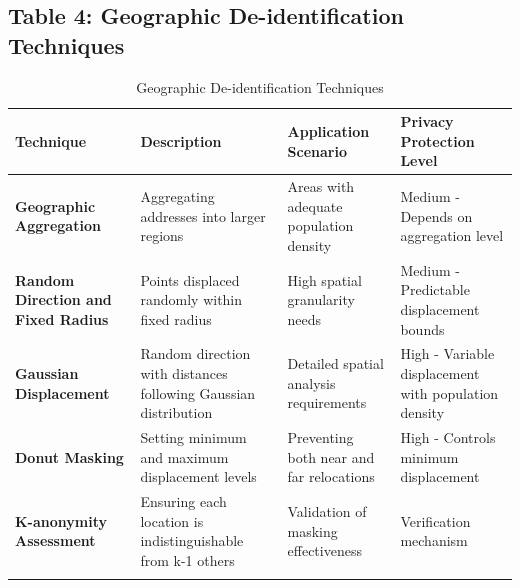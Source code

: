 \documentclass[12pt,a4paper,landscape]{article}
\begin{document}
\subsection*{Table 4: Geographic De-identification Techniques}
\begin{longtable}{L{4cm}L{6cm}L{6cm}L{4cm}}
\toprule
\textbf{Technique} & \textbf{Description} & \textbf{Application Scenario} & \textbf{Privacy Protection Level} \\
\midrule
\endhead

\textbf{Geographic Aggregation} 
& Aggregating addresses into larger regions 
& Areas with adequate population density 
& Medium - Depends on aggregation level \\
\midrule

\textbf{Random Direction and Fixed Radius} 
& Points displaced randomly within fixed radius 
& High spatial granularity needs 
& Medium - Predictable displacement bounds \\
\midrule

\textbf{Gaussian Displacement} 
& Random direction with distances following Gaussian distribution 
& Detailed spatial analysis requirements 
& High - Variable displacement with population density \\
\midrule

\textbf{Donut Masking} 
& Setting minimum and maximum displacement levels 
& Preventing both near and far relocations 
& High - Controls minimum displacement \\
\midrule

\textbf{K-anonymity Assessment} 
& Ensuring each location is indistinguishable from k-1 others 
& Validation of masking effectiveness 
& Verification mechanism \\
\bottomrule
\caption{Geographic De-identification Techniques}
\end{longtable}
\clearpage

\end{document}
